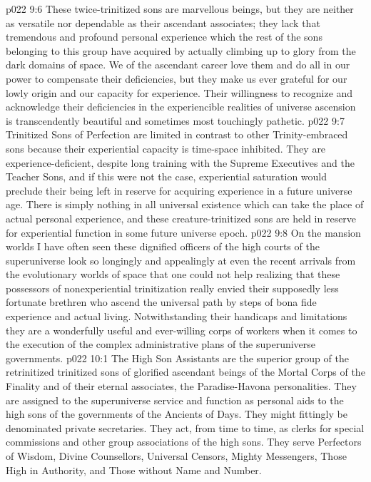 \vs p022 9:6 These twice\hyp{}trinitized sons are marvellous beings, but they are neither as versatile nor dependable as their ascendant associates; they lack that tremendous and profound personal experience which the rest of the sons belonging to this group have acquired by actually climbing up to glory from the dark domains of space. We of the ascendant career love them and do all in our power to compensate their deficiencies, but they make us ever grateful for our lowly origin and our capacity for experience. Their willingness to recognize and acknowledge their deficiencies in the experiencible realities of universe ascension is transcendently beautiful and sometimes most touchingly pathetic.
\vs p022 9:7 Trinitized Sons of Perfection are limited in contrast to other Trinity\hyp{}embraced sons because their experiential capacity is time\hyp{}space inhibited. They are experience\hyp{}deficient, despite long training with the Supreme Executives and the Teacher Sons, and if this were not the case, experiential saturation would preclude their being left in reserve for acquiring experience in a future universe age. There is simply nothing in all universal existence which can take the place of actual personal experience, and these creature\hyp{}trinitized sons are held in reserve for experiential function in some future universe epoch.
\vs p022 9:8 On the mansion worlds I have often seen these dignified officers of the high courts of the superuniverse look so longingly and appealingly at even the recent arrivals from the evolutionary worlds of space that one could not help realizing that these possessors of nonexperiential trinitization really envied their supposedly less fortunate brethren who ascend the universal path by steps of bona fide experience and actual living. Notwithstanding their handicaps and limitations they are a wonderfully useful and ever\hyp{}willing corps of workers when it comes to the execution of the complex administrative plans of the superuniverse governments.
\vs p022 10:1 The High Son Assistants are the superior group of the retrinitized trinitized sons of glorified ascendant beings of the Mortal Corps of the Finality and of their eternal associates, the Paradise\hyp{}Havona personalities. They are assigned to the superuniverse service and function as personal aids to the high sons of the governments of the Ancients of Days. They might fittingly be denominated private secretaries. They act, from time to time, as clerks for special commissions and other group associations of the high sons. They serve Perfectors of Wisdom, Divine Counsellors, Universal Censors, Mighty Messengers, Those High in Authority, and Those without Name and Number.
